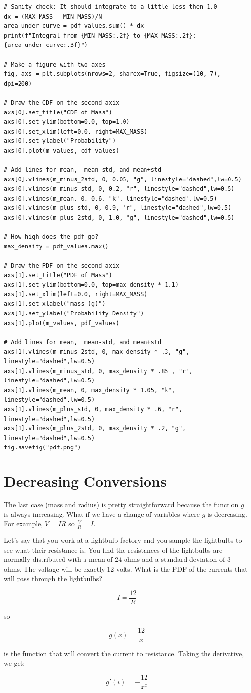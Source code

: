 \begin{verbatim}
# Sanity check: It should integrate to a little less then 1.0
dx = (MAX_MASS - MIN_MASS)/N
area_under_curve = pdf_values.sum() * dx
print(f"Integral from {MIN_MASS:.2f} to {MAX_MASS:.2f}: {area_under_curve:.3f}")

# Make a figure with two axes
fig, axs = plt.subplots(nrows=2, sharex=True, figsize=(10, 7), dpi=200)

# Draw the CDF on the second axix
axs[0].set_title("CDF of Mass")
axs[0].set_ylim(bottom=0.0, top=1.0)
axs[0].set_xlim(left=0.0, right=MAX_MASS)
axs[0].set_ylabel("Probability")
axs[0].plot(m_values, cdf_values)

# Add lines for mean,  mean-std, and mean+std
axs[0].vlines(m_minus_2std, 0, 0.05, "g", linestyle="dashed",lw=0.5)
axs[0].vlines(m_minus_std, 0, 0.2, "r", linestyle="dashed",lw=0.5)
axs[0].vlines(m_mean, 0, 0.6, "k", linestyle="dashed",lw=0.5)
axs[0].vlines(m_plus_std, 0, 0.9, "r", linestyle="dashed",lw=0.5)
axs[0].vlines(m_plus_2std, 0, 1.0, "g", linestyle="dashed",lw=0.5)

# How high does the pdf go?
max_density = pdf_values.max()

# Draw the PDF on the second axix
axs[1].set_title("PDF of Mass")
axs[1].set_ylim(bottom=0.0, top=max_density * 1.1)
axs[1].set_xlim(left=0.0, right=MAX_MASS)
axs[1].set_xlabel("mass (g)")
axs[1].set_ylabel("Probability Density")
axs[1].plot(m_values, pdf_values)

# Add lines for mean,  mean-std, and mean+std
axs[1].vlines(m_minus_2std, 0, max_density * .3, "g", linestyle="dashed",lw=0.5)
axs[1].vlines(m_minus_std, 0, max_density * .85 , "r", linestyle="dashed",lw=0.5)
axs[1].vlines(m_mean, 0, max_density * 1.05, "k", linestyle="dashed",lw=0.5)
axs[1].vlines(m_plus_std, 0, max_density * .6, "r", linestyle="dashed",lw=0.5)
axs[1].vlines(m_plus_2std, 0, max_density * .2, "g", linestyle="dashed",lw=0.5)
fig.savefig("pdf.png")
\end{verbatim}

\section{Decreasing Conversions}

The last case (mass and radius) is pretty straightforward because the function $g$ is always increasing.  What if we have a change of variables where 
$g$ is decreasing.   For example,  $V= IR$ so $\frac{V}{R} = I$.

Let's say that you work at a lightbulb factory and you sample the lightbulbs to see what their resistance is.  You find the resistances of the lightbulbs are normally distributed with a mean of 24 ohms and a standard deviation of 3 ohms.  The voltage will be exactly 12 volts.  What is the PDF of the currents that will pass through the lightbulbs?

$$I = \frac{12}{R}$$

so 

$$g(x) = \frac{12}{x}$$

is the function that will convert the current to resistance.  Taking the derivative,  we get:

$$g'(i) = -\frac{12}{x^2}$$










